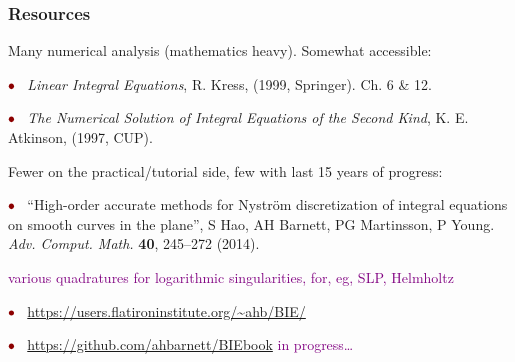 \documentclass[t]{beamer}
\newcommand{\ft}[1]{\frametitle{#1}}
\newcommand{\com}[1]{{\scriptsize \textcolor{purple}{#1}}}      %
\newcommand{\vg}{\vspace{2ex}}
\newcommand{\hg}{\vspace{0.5ex}}
\newcommand{\rb}{\ensuremath{\textcolor{darkred}{\bullet\;}}\ }
\begin{document}
\begin{frame}\ft{Resources}  %

Many numerical analysis (mathematics heavy). Somewhat accessible:

\hg

\rb {\em Linear Integral Equations}, R. Kress, (1999, Springer). Ch. 6 \& 12.

\hg

\rb {\em The Numerical Solution of Integral Equations of the Second Kind},
K. E. Atkinson, (1997, CUP).




\vg

Fewer on the practical/tutorial side, few with last 15 years of progress:

\hg

\rb ``High-order accurate methods for Nystr\"om discretization of integral equations on smooth curves in the plane'', S Hao, AH Barnett, PG Martinsson, P Young.
{\em Adv. Comput. Math.} {\bf 40}, 245--272 (2014).

\hfill \com{various quadratures for logarithmic singularities,
  for, eg, SLP, Helmholtz}

\hg

\rb \url{https://users.flatironinstitute.org/~ahb/BIE/}

\hg

\rb \url{https://github.com/ahbarnett/BIEbook} \hfill \com{in progress\dots}

\end{frame}
\end{document}
